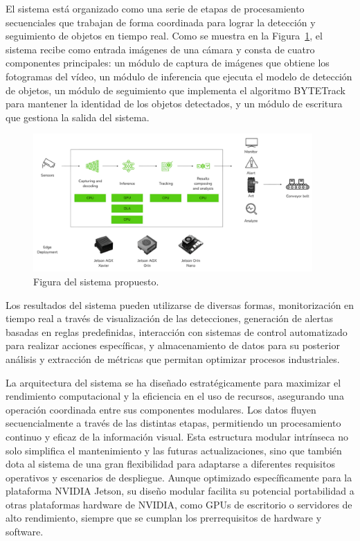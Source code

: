 \documentclass[11pt,spanish,listoffigures,listoftables]{tfgetsinf}
\begin{document}
El sistema está organizado como una serie de etapas de procesamiento secuenciales que trabajan de forma coordinada para lograr la detección y seguimiento de objetos en tiempo real. Como se muestra en la Figura~\ref{fig:sistema_propuesto}, el sistema recibe como entrada imágenes de una cámara y consta de cuatro componentes principales: un módulo de captura de imágenes que obtiene los fotogramas del vídeo, un módulo de inferencia que ejecuta el modelo de detección de objetos, un módulo de seguimiento que implementa el algoritmo BYTETrack para mantener la identidad de los objetos detectados, y un módulo de escritura que gestiona la salida del sistema.
\begin{figure}[H]
   \centering
   \includegraphics[width=0.95\textwidth]{images/diseno_e_implementacion/figura_TFG_v3.png}
   \caption[Figura del sistema propuesto]{Figura del sistema propuesto.}
   \label{fig:sistema_propuesto}
\end{figure}

Los resultados del sistema pueden utilizarse de diversas formas, monitorización en tiempo real a través de visualización de las detecciones, generación de alertas basadas en reglas predefinidas, interacción con sistemas de control automatizado para realizar acciones específicas, y almacenamiento de datos para su posterior análisis y extracción de métricas que permitan optimizar procesos industriales.

La arquitectura del sistema se ha diseñado estratégicamente para maximizar el rendimiento computacional y la eficiencia en el uso de recursos, asegurando una operación coordinada entre sus componentes modulares. Los datos fluyen secuencialmente a través de las distintas etapas, permitiendo un procesamiento continuo y eficaz de la información visual. Esta estructura modular intrínseca no solo simplifica el mantenimiento y las futuras actualizaciones, sino que también dota al sistema de una gran flexibilidad para adaptarse a diferentes requisitos operativos y escenarios de despliegue. Aunque optimizado específicamente para la plataforma NVIDIA Jetson, su diseño modular facilita su potencial portabilidad a otras plataformas hardware de NVIDIA, como GPUs de escritorio o servidores de alto rendimiento, siempre que se cumplan los prerrequisitos de hardware y software.
\end{document}
